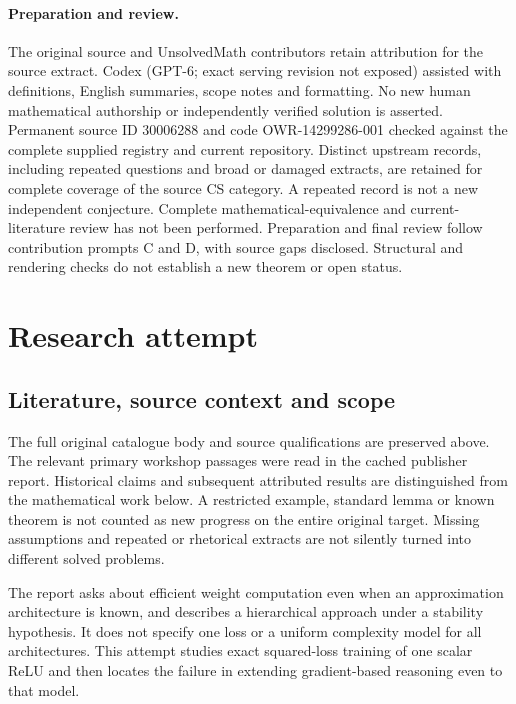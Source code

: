 \documentclass[11pt]{article}
\begin{document}
\paragraph{Preparation and review.}
The original source and UnsolvedMath contributors retain attribution for the source extract. Codex (GPT-6; exact serving revision not exposed) assisted with definitions, English summaries, scope notes and formatting. No new human mathematical authorship or independently verified solution is asserted. Permanent source ID 30006288 and code OWR-14299286-001 checked against the complete supplied registry and current repository. Distinct upstream records, including repeated questions and broad or damaged extracts, are retained for complete coverage of the source CS category. A repeated record is not a new independent conjecture. Complete mathematical-equivalence and current-literature review has not been performed. Preparation and final review follow contribution prompts C and D, with source gaps disclosed. Structural and rendering checks do not establish a new theorem or open status.
\label{end:30006288}

\section{Research attempt}
\subsection{Literature, source context and scope}
The full original catalogue body and source qualifications are preserved above. The relevant primary workshop passages were read in the cached publisher report. Historical claims and subsequent attributed results are distinguished from the mathematical work below. A restricted example, standard lemma or known theorem is not counted as new progress on the entire original target. Missing assumptions and repeated or rhetorical extracts are not silently turned into different solved problems.

The report asks about efficient weight computation even when an approximation architecture is known, and describes a hierarchical approach under a stability hypothesis. It does not specify one loss or a uniform complexity model for all architectures. This attempt studies exact squared-loss training of one scalar ReLU and then locates the failure in extending gradient-based reasoning even to that model.
\end{document}
